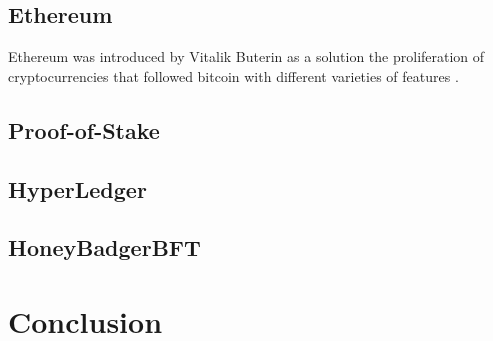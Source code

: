 \subsection{Ethereum}

Ethereum was introduced by Vitalik Buterin as a solution the proliferation of cryptocurrencies that followed bitcoin
with different varieties of features \cite{buterin2013ethereum}.

\subsection{Proof-of-Stake}

\subsection{HyperLedger}

\subsection{HoneyBadgerBFT}


\section{Conclusion}

